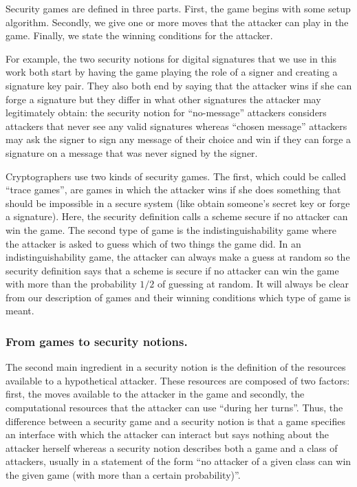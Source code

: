 \documentclass[envcountsame]{llncs}
\begin{document}
Security games are defined in three parts. First, the game begins with some
setup algorithm. Secondly, we give one or more moves that the attacker can play
in the game. Finally, we state the winning conditions for the attacker.

For example, the two security notions for digital signatures that we use in this
work both start by having the game playing the role of a signer and creating a
signature key pair. They also both end by saying that the attacker wins if she
can forge a signature but they differ in what other signatures the attacker may
legitimately obtain: the security notion for ``no-message'' attackers considers
attackers that never see any valid signatures whereas ``chosen message''
attackers may ask the signer to sign any message of their choice and win if they
can forge a signature on a message that was never signed by the signer.

Cryptographers use two kinds of security games. The first, which could be called
``trace games'', are games in which the attacker wins if she does something that
should be impossible in a secure system (like obtain someone's secret key or
forge a signature). Here, the security definition calls a scheme secure if no
attacker can win the game. The second type of game is the indistinguishability
game where the attacker is asked to guess which of two things the game did. In
an indistinguishability game, the attacker can always make a guess at random so
the security definition says that a scheme is secure if no attacker can win the
game with more than the probability $1/2$ of guessing at random. It will always
be clear from our description of games and their winning conditions which type
of game is meant.

\subsubsection{From games to security notions.}
The second main ingredient in a security notion is the definition of the
resources available to a hypothetical attacker. These resources are composed of
two factors: first, the moves available to the attacker in the game and
secondly, the computational resources that the attacker can use ``during her
turns''. Thus, the difference between a security game and a security notion is
that a game specifies an interface with which the attacker can interact but says
nothing about the attacker herself whereas a security notion describes both a
game and a class of attackers, usually in a statement of the form ``no attacker
of a given class can win the given game (with more than a certain probability)''.
\end{document}
